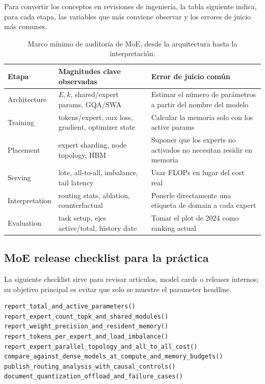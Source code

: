 Para convertir los conceptos en revisiones de ingeniería, la tabla siguiente indica, para cada etapa, las variables que más conviene observar y los errores de juicio más comunes.

\begin{table}[H]
\centering
\small
\begin{tabularx}{\textwidth}{L{0.16\textwidth} L{0.27\textwidth} X}
\toprule
Etapa & Magnitudes clave observadas & Error de juicio común \\
\midrule
Architecture & $E,k$, shared/expert params, GQA/SWA & Estimar el número de parámetros a partir del nombre del modelo \\
Training & tokens/expert, aux loss, gradient, optimizer state & Calcular la memoria solo con los active params \\
Placement & expert sharding, node topology, HBM & Suponer que los experts no activados no necesitan residir en memoria \\
Serving & lote, all-to-all, imbalance, tail latency & Usar FLOPs en lugar del cost real \\
Interpretation & routing stats, ablation, counterfactual & Ponerle directamente una etiqueta de domain a cada expert \\
Evaluation & task setup, ejes active/total, history date & Tomar el plot de 2024 como ranking actual \\
\bottomrule
\end{tabularx}
\caption{Marco mínimo de auditoría de MoE, desde la arquitectura hasta la interpretación.}
\end{table}

\subsection{MoE release checklist para la práctica}

La siguiente checklist sirve para revisar artículos, model cards o releases internos; su objetivo principal es evitar que solo se muestre el parameter headline.

\begin{lstlisting}[caption={Sparse MoE release checklist}]
report_total_and_active_parameters()
report_expert_count_topk_and_shared_modules()
report_weight_precision_and_resident_memory()
report_tokens_per_expert_and_load_imbalance()
report_expert_parallel_topology_and_all_to_all_cost()
compare_against_dense_models_at_compute_and_memory_budgets()
publish_routing_analysis_with_causal_controls()
document_quantization_offload_and_failure_cases()
\end{lstlisting}

